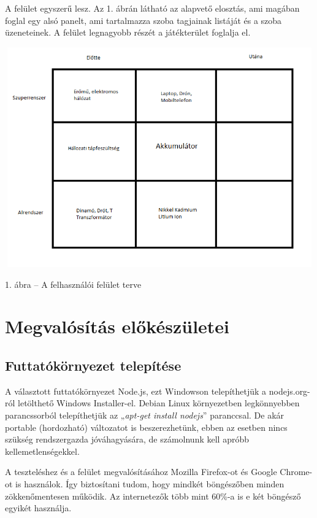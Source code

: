 \documentclass[]{article}
\begin{document}
A felület egyszerű lesz. Az 1. ábrán látható az alapvető elosztás, ami
magában foglal egy alsó panelt, ami tartalmazza szoba tagjainak listáját
és a szoba üzeneteinek. A felület legnagyobb részét a játékterület
foglalja el.

\includegraphics[width=5.375in,height=3.73238in]{media/image1.png}

1. ábra -- A felhasználói felület terve

\hypertarget{megvaluxf3suxedtuxe1s-elux151kuxe9szuxfcletei}{%
\section{Megvalósítás
előkészületei}\label{megvaluxf3suxedtuxe1s-elux151kuxe9szuxfcletei}}

\hypertarget{futtatuxf3kuxf6rnyezet-telepuxedtuxe9se}{%
\subsection{Futtatókörnyezet
telepítése}\label{futtatuxf3kuxf6rnyezet-telepuxedtuxe9se}}

A választott futtatókörnyezet Node.js, ezt Windowson telepíthetjük a
nodejs.org-ról letölthető Windows Installer-el. Debian Linux
környezetben legkönnyebben parancssorból telepíthetjük az „\emph{apt-get
install nodejs}'' paranccsal. De akár portable (hordozható) változatot
is beszerezhetünk, ebben az esetben nincs szükség rendszergazda
jóváhagyására, de számolnunk kell apróbb kellemetlenségekkel.

A teszteléshez és a felület megvalósításához Mozilla Firefox-ot és
Google Chrome-ot is használok. Így biztosítani tudom, hogy mindkét
böngészőben minden zökkenőmentesen működik. Az internetezők több mint
60\%-a is e két böngésző egyikét használja.
\end{document}
